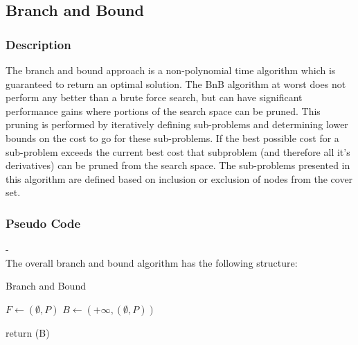 \documentclass[acmlarge]{acmart}
\begin{document}
\subsection{Branch and Bound}

\subsubsection{Description}

The branch and bound approach is a non-polynomial time algorithm which is guaranteed to return an optimal solution. The BnB algorithm at worst does not perform any better than a brute force search, but can have significant performance gains where portions of the search space can be pruned. This pruning is performed by iteratively defining sub-problems and determining lower bounds on the cost to go for these sub-problems. If the best possible cost for a sub-problem exceeds the current best cost that subproblem (and therefore all it's derivatives) can be pruned from the search space. The sub-problems presented in this algorithm are defined based on inclusion or exclusion of nodes from the cover set. 

\newpage
\subsubsection{Pseudo Code}

-\\

The overall branch and bound algorithm has the following structure:\\

\begin{algorithm}[H]
	\caption{Branch and Bound}
	\SetAlgoLined
	
	$F \leftarrow {(\emptyset,P)}$\;
	$B \leftarrow {(+\infty,(\emptyset,P))}$\;
	
	return (B)
\end{algorithm}
\end{document}
